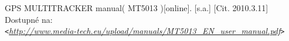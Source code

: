 \begin{thebibliography}{99}
GPS MULTITRACKER manual( MT5013 )[online]. [s.a.] [Cit. 2010.3.11] Dostupné na: \\
\verb|<|\emph{\url{http://www.media-tech.eu/upload/manuals/MT5013_EN_user_manual.pdf}}\verb|>|



\end{thebibliography}
